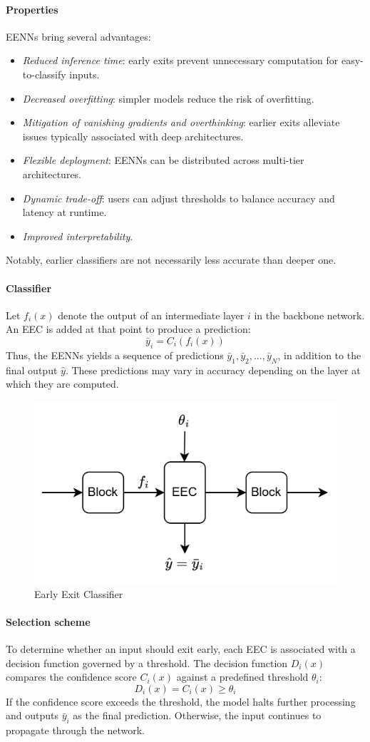\paragraph*{Properties}
EENNs bring several advantages:
\begin{itemize}
    \item \textit{Reduced inference time}: early exits prevent unnecessary computation for easy-to-classify inputs.
    \item \textit{Decreased overfitting}: simpler models reduce the risk of overfitting.
    \item \textit{Mitigation of vanishing gradients and overthinking}: earlier exits alleviate issues typically associated with deep architectures.
    \item \textit{Flexible deployment}: EENNs can be distributed across multi-tier architectures.
    \item \textit{Dynamic trade-off}: users can adjust thresholds to balance accuracy and latency at runtime.
    \item \textit{Improved interpretability}.
\end{itemize}
\noindent Notably, earlier classifiers are not necessarily less accurate than deeper one.

\paragraph*{Classifier}
Let $f_i(x)$ denote the output of an intermediate layer $i$ in the backbone network.
An EEC is added at that point to produce a prediction:
\[\bar{y}_i=C_i(f_i(x))\]
Thus, the EENNs yields a sequence of predictions $\bar{y}_1,\bar{y}_2,\dots,\bar{y}_N$, in addition to the final output $\hat{y}$.
These predictions may vary in accuracy depending on the layer at which they are computed.
\begin{figure}[H]
    \centering
    \includegraphics[width=0.5\linewidth]{images/eeai11.png}
    \caption{Early Exit Classifier}
\end{figure}

\paragraph*{Selection scheme}
To determine whether an input should exit early, each EEC is associated with a decision function governed by a threshold.
The decision function $D_i(x)$ compares the confidence score $C_i (x)$  against a predefined threshold $\theta_i$: 
\[D_i(x) = C_i (x) \geq \theta_i\]
\noindent If the confidence score exceeds the threshold, the model halts further processing and outputs $\bar{y}_i$ as the final prediction.
Otherwise, the input continues to propagate through the network.

